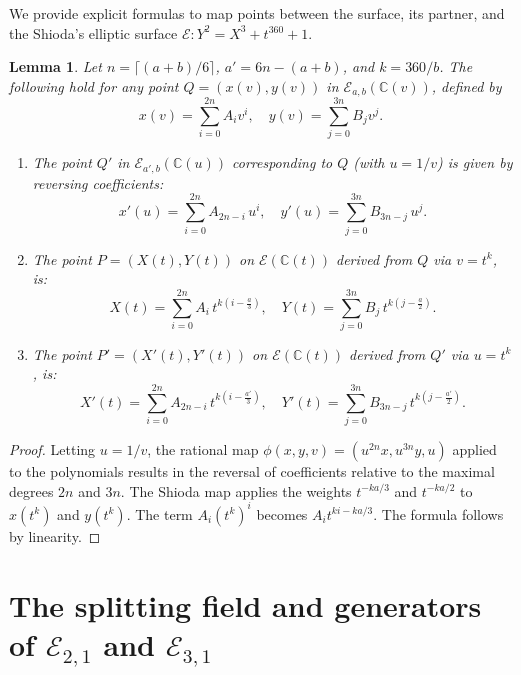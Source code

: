 \documentclass[11pt]{amsart}
\newcommand{\CC}{{\mathbb C}}
\newcommand{\Ee}{{\mathcal E}}
\newtheorem{lema}[thm]{Lemma}
\numberwithin{equation}{section}
\numberwithin{table}{section}
\newcommand\<{\langle}
\begin{document}
We provide explicit formulas to map points between the surface, its partner, and the Shioda's elliptic  surface $\Ee: Y^2 = X^3 + t^{360} + 1$.

\begin{lema} 
	\label{lem:poly_transform}
	Let $n = \lceil (a+b)/6 \rceil$,  $a' = 6n-(a+b)$,  	 and $k = 360/b$.
	The following hold for any point $Q = (x(v), y(v))$     in $\Ee_{a,b}(\CC(v))$,  defined by
	\[ x(v) = \sum_{i=0}^{2n} A_i v^i, \quad y(v) = \sum_{j=0}^{3n} B_j v^j. \]

	
	\begin{enumerate}
		\item [(i)]  The point $Q'$ in $\Ee_{a', b}(\CC(u))$ corresponding to $Q$ (with $u=1/v$) is given by reversing coefficients:
		\[ x'(u) = \sum_{i=0}^{2n} A_{2n-i} \, u^i, \quad y'(u) = \sum_{j=0}^{3n} B_{3n-j} \, u^j. \]
		
		\item [(ii)]   The point $P=(X(t), Y(t))$ on $\Ee(\CC(t))$  derived from  $Q$ via $v=t^k$, is:
		\[ X(t) = \sum_{i=0}^{2n} A_i \, t^{k(i - \frac{a}{3})}, \quad Y(t) = \sum_{j=0}^{3n} B_j \, t^{k(j - \frac{a}{2})}. \]
		
		\item [(iii)]   The point $P'=(X'(t), Y'(t))$ on $\Ee(\CC(t))$  
		 derived from $Q'$ via $u=t^k$, is:
		\[ X'(t) = \sum_{i=0}^{2n} A_{2n-i} \, t^{k(i - \frac{a'}{3})}, \quad Y'(t) = \sum_{j=0}^{3n} B_{3n-j} \, t^{k(j - \frac{a'}{2})}. \]
	\end{enumerate}
\end{lema}

\begin{proof}
	Letting $u=1/v$, the rational map $\phi(x,y,v) = (u^{2n}x, u^{3n}y,u)$ applied to the polynomials results in the reversal of coefficients relative to the maximal degrees $2n$ and $3n$. 
	The Shioda map applies the weights $t^{-ka/3}$ and $t^{-ka/2}$ to $x(t^k)$ and $y(t^k)$. The term $A_i (t^k)^i$ becomes $A_i t^{ki - ka/3}$. The formula follows by linearity.
\end{proof}


 


 



 \section{The splitting field and generators of $\Ee_{2,1}$ and $\Ee_{3,1}$}
\label{A2-(2,1)}
\end{document}
